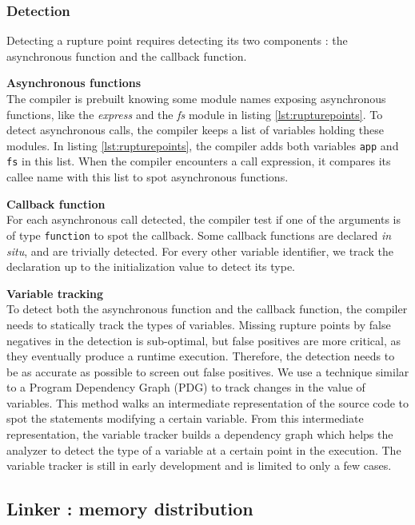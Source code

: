 \subsubsection{Detection}

Detecting a rupture point requires detecting its two components : the asynchronous function and the callback function.

\textbf{Asynchronous functions}\\
The compiler is prebuilt knowing some module names exposing asynchronous functions, like the \textit{express} and the \textit{fs} module in listing \ref{lst:rupturepoints}.
To detect asynchronous calls, the compiler keeps a list of variables holding these modules.
In listing \ref{lst:rupturepoints}, the compiler adds both variables \texttt{app} and \texttt{fs} in this list.
When the compiler encounters a call expression, it compares its callee name with this list to spot asynchronous functions.

\textbf{Callback function}\\
For each asynchronous call detected, the compiler test if one of the arguments is of type \texttt{function} to spot the callback.
Some callback functions are declared \textit{in situ}, and are trivially detected.
For every other variable identifier, we track the declaration up to the initialization value to detect its type.

\textbf{Variable tracking}\\
To detect both the asynchronous function and the callback function, the compiler needs to statically track the types of variables.
Missing rupture points by false negatives in the detection is sub-optimal, but false positives are more critical, as they eventually produce a runtime execution.
Therefore, the detection needs to be as accurate as possible to screen out false positives.
We use a technique similar to a Program Dependency Graph (PDG)\cite{Ferrante1987} to track changes in the value of variables.
This method walks an intermediate representation of the source code to spot the statements modifying a certain variable.
From this intermediate representation, the variable tracker builds a dependency graph which helps the analyzer to detect the type of a variable at a certain point in the execution.
The variable tracker is still in early development and is limited to only a few cases.

\subsection{Linker : memory distribution} \label{section:linker}

